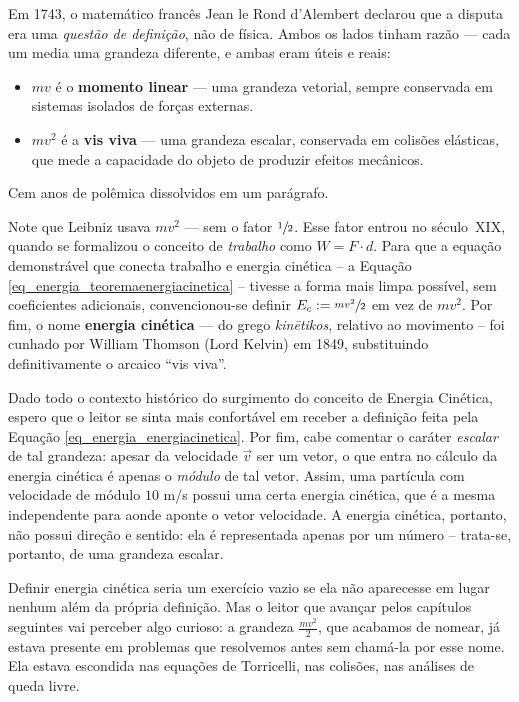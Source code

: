 \medskip

Em 1743, o matemático francês Jean le Rond d'Alembert declarou que a disputa era uma \textit{questão
de definição}, não de física. Ambos os lados tinham razão — cada um media uma grandeza
diferente, e ambas eram úteis e reais:
 
\begin{itemize}
    \item $mv$ é o \textbf{momento linear} — uma grandeza vetorial, sempre conservada
    em sistemas isolados de forças externas.
    \item $mv^2$ é a \textbf{vis viva} — uma grandeza escalar, conservada em colisões
    elásticas, que mede a capacidade do objeto de produzir efeitos mecânicos.
\end{itemize}
 
\noindent Cem anos de polêmica dissolvidos em um parágrafo. 
 
\medskip

Note que Leibniz usava $mv^2$ — sem o fator $\sfrac{1}{2}$. Esse fator entrou no
século~XIX, quando se formalizou o conceito de \textit{trabalho}
como $W = F \cdot d$. Para que a equação demonstrável que conecta trabalho e energia
cinética -- a Equação \eqref{eq_energia_teoremaenergiacinetica} -- tivesse a forma mais limpa possível, sem coeficientes
adicionais, convencionou-se definir $E_c := \sfrac{mv^2}{2}$ em vez de $mv^2$. Por fim, o nome \textbf{energia cinética} — do grego \textit{kin\={e}tikos}, relativo ao
movimento -- foi cunhado por William Thomson (Lord Kelvin) em 1849, substituindo
definitivamente o arcaico ``vis viva''.


Dado todo o contexto histórico do surgimento do conceito de Energia Cinética, espero que o leitor se sinta mais confortável em receber a definição feita pela Equação \eqref{eq_energia_energiacinetica}. Por fim, cabe comentar o caráter \emph{escalar} de tal grandeza: apesar da velocidade $\vec v$ ser um vetor, o que entra no cálculo da energia cinética é apenas o \emph{módulo} de tal vetor. Assim, uma partícula com velocidade de módulo $10$ m/s possui uma certa energia cinética, que é a mesma independente para aonde aponte o vetor velocidade. A energia cinética, portanto, não possui direção e sentido: ela é representada apenas por um número -- trata-se, portanto, de uma grandeza escalar.






Definir energia cinética seria um exercício vazio se ela não aparecesse em lugar
nenhum além da própria definição. Mas o leitor que avançar pelos capítulos seguintes
vai perceber algo curioso: a grandeza $\frac{mv^2}{2}$, que acabamos de nomear, já
estava presente em problemas que resolvemos antes sem chamá-la por esse nome. Ela
estava escondida nas equações de Torricelli, nas colisões, nas análises de queda
livre. 
 
